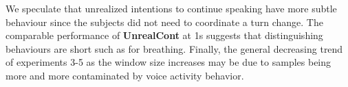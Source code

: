 \documentclass[sigconf]{acmart}
\begin{document}
We speculate that unrealized intentions to continue speaking have more subtle behaviour since the subjects did not need to coordinate a turn change. The comparable performance of \textbf{UnrealCont} at 1s suggests that distinguishing behaviours are short such as for breathing. Finally, the general decreasing trend of experiments 3-5 as the window size increases may be due to samples being more and more contaminated by voice activity behavior. 




\end{document}
